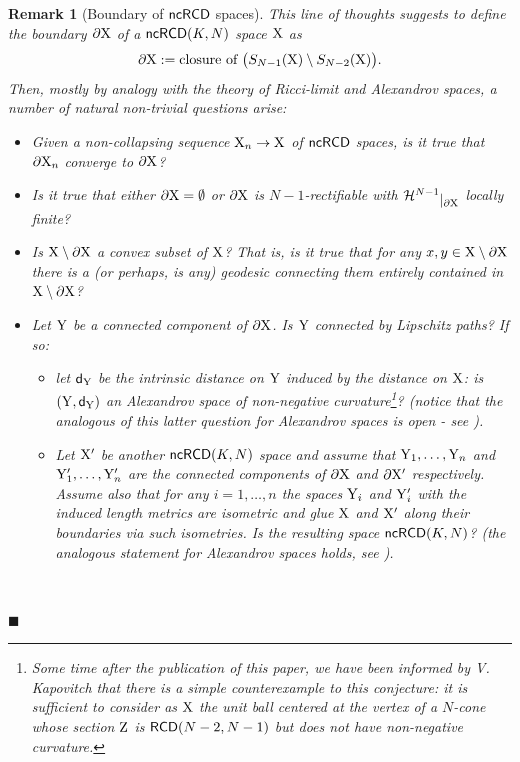 \documentclass[reqno,11pt]{article}
\numberwithin{equation}{section}
\newcommand{\Z}{\mathbb{Z}}
\newcommand{\sfd}{{\sf d}}
\newcommand{\restr}[1]{\lower3pt\hbox{$|_{#1}$}}
\newcommand{\fr}{\penalty-20\null\hfill$\blacksquare$}                      %
\newtheorem{remark}[theorem]{Remark}
\newcommand{\X}{{\rm X}}
\newcommand{\Y}{{\rm Y}}
\renewcommand{\Z}{{\rm Z}}
\newcommand{\RCD}{{\sf RCD}}
\newcommand{\ncRCD}{{\sf ncRCD}}
\newcommand{\HH}{{\mathcal H}}
\begin{document}
\begin{remark}[Boundary of $\ncRCD$ spaces]
{This line of thoughts suggests to define the boundary $\partial\X$ of a $\ncRCD(K,N)$ space $\X$ as
\[
\partial\X:=\text{closure of }\big(S_{N-1}(\X)\setminus S_{N-2}(\X)\big).
\] 
Then, mostly by analogy with the theory of Ricci-limit and Alexandrov spaces,  a number of natural non-trivial questions arise:
\begin{itemize}
\item[-] Given a non-collapsing sequence $\X_n\to \X$  of $\ncRCD$ spaces, is it true that $\partial\X_n$ converge to $\partial\X$?
\item[-] Is it true that either $\partial\X=\emptyset$ or  $\partial\X$ is $N-1$-rectifiable with $\HH^{N-1}\restr{\partial \X}$ locally finite?
\item[-] Is $\X\setminus\partial\X$ a convex subset of $\X$? That is, is it true that for any $x,y\in \X\setminus\partial\X$ there is a (or perhaps, is any) geodesic connecting them entirely contained in $\X\setminus\partial\X$? 
\item[-] Let $\Y$ be a connected component of  $\partial\X$. Is $\Y$ connected by Lipschitz paths? If so:
\begin{itemize}
\item let $\sfd_\Y$ be the intrinsic distance on $\Y$ induced by the distance on $\X$: is $(\Y,\sfd_\Y)$  an Alexandrov space of non-negative curvature\footnote{Some time after  the publication of this paper, we have been informed by V. Kapovitch that there is a simple counterexample to this conjecture: it is sufficient to consider as \(\X\) the unit ball centered  at the vertex of a \(N\)-cone whose section \(\Z\) is \(\RCD(N-2,N-1)\) but does not have non-negative curvature.}? (notice that the analogous of this latter question for Alexandrov spaces is open - see \cite[Section 9]{Petrunin07}).
\item Let  $\X'$ be another $\ncRCD(K,N)$ space and assume that $\Y_1,\ldots,\Y_n$ and $\Y_1',\ldots,\Y_n'$ are the connected components of $\partial\X$ and $\partial\X'$ respectively. Assume also that for any $i=1,\ldots,n$ the spaces $\Y_i$ and $\Y_i'$ with the induced length metrics are isometric and glue  $\X$ and $\X'$ along their boundaries via such isometries. Is the resulting space $\ncRCD(K,N)$? (the analogous statement for Alexandrov spaces holds, see \cite{Petrunin97}).
\end{itemize}
\end{itemize} \ 
}\fr\end{remark}
\end{document}
